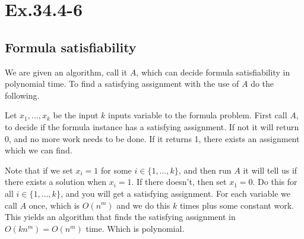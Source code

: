 \section*{Ex.34.4-6}
\subsection*{Formula satisfiability}

We are given an algorithm, call it $A$, which can decide formula satisfiability in polynomial time. To find a satisfying assignment with the use of $A$ do the following.

Let $x_1,\ldots,x_k$ be the input $k$ inputs variable to the formula problem. First call $A$, to decide if the formula instance has a satisfying assignment. If not it will return 0, and no more work needs to be done. If it returns 1, there exists an assignment which we can find.

Note that if we set $x_i=1$ for some $i\in\{1,\ldots,k\}$, and then run $A$ it will tell us if there exists a solution when $x_i=1$. If there doesn't, then set $x_1 =0$. Do this for all $i\in\{1,\ldots,k\}$, and you will get a satisfying assignment. For each variable we call $A$ once, which is $O(n^m)$ and we do this $k$ times plus some constant work. This yields an algorithm that finds the satisfying assignment in $O(kn^m)=O(n^m)$ time. Which is polynomial.

